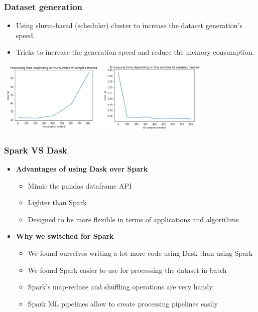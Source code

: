 \documentclass[slidestop,compress,red,mathserif]{beamer}
\begin{document}
\begin{frame}
	\frametitle{Dataset generation}
	\begin{itemize}
		\item Using slurm-based (scheduler) cluster to increase the dataset generation's speed.
    \item Tricks to increase the generation speed and reduce the memory consumption.
	\end{itemize}
\centering
\includegraphics[height=3.5cm, keepaspectratio]{Figures/timeVSsamples_generatepositivesamples.png}
\includegraphics[height=3.5cm, keepaspectratio]{Figures/timeVSsamples_generatepositivesamples_after.png}
\end{frame}

\begin{frame}
	\frametitle{Spark VS Dask}
	\begin{itemize}
    \item[] \textbf{Advantages of using Dask over Spark}
      \begin{itemize}
      	\item Mimic the pandas dataframe API
        \item Lighter than Spark
      	\item Designed to be more flexible in terms of applications and algorithms
      \end{itemize}
    \item[] \textbf{Why we switched for Spark}
      \begin{itemize}
        \item We found ourselves writing a lot more code using Dask than using Spark
        \item We found Spark easier to use for processing the dataset in batch
        \item Spark's map-reduce and shuffling operations are very handy
        \item Spark ML pipelines allow to create processing pipelines easily
      \end{itemize}
	\end{itemize}
\end{frame}
\end{document}
